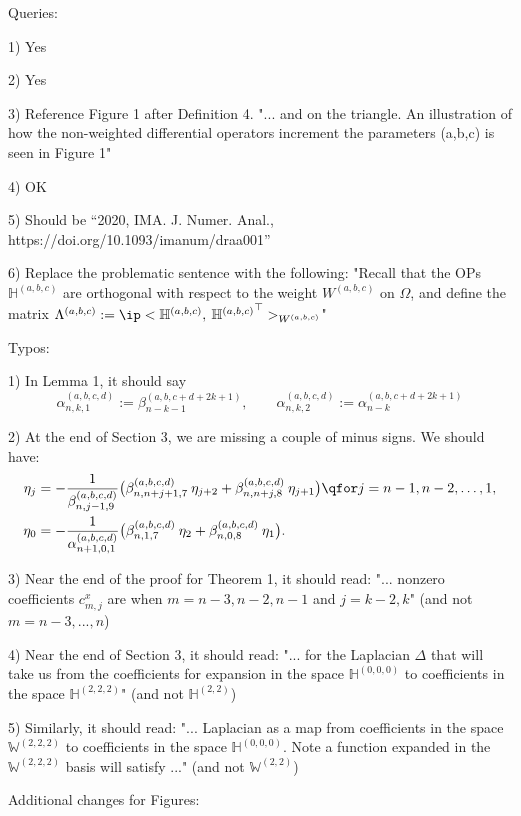 \documentclass[11pt, oneside]{article}   	%
\begin{document}
Queries:

1) Yes 

2) Yes

3) Reference Figure 1 after Definition 4.
	"... and on the triangle. An illustration of how the non-weighted differential operators increment the parameters (a,b,c) is seen in Figure 1"
	
4) OK

5) Should be ``2020, IMA. J. Numer. Anal., https://doi.org/10.1093/imanum/draa001''

6) Replace the problematic sentence with the following:
	"Recall that the OPs $\mathbb{H}^{(a,b,c)}$ are orthogonal with respect to the weight $W^{(a,b,c)}$ on $\Omega$, and define the matrix $\Lambda^{(a,b,c)} := \ip< \mathbb{H}^{(a,b,c)}, \: {\mathbb{H}^{(a,b,c)}}^\top >_{W^{(a,b,c)}}$"
	
	
Typos:

1) In Lemma 1, it should say 
$$
\alpha^{(a,b,c,d)}_{n,k,1} := \beta_{n-k-1}^{(a, b, c+d+2k+1)}, \qquad \alpha^{(a,b,c,d)}_{n,k,2} := \alpha_{n-k}^{(a, b, c+d+2k+1)}
$$

2) At the end of Section 3, we are missing a couple of minus signs. We should have:
\begin{align*}
	\eta_j &= - \frac{1}{\beta^{(a,b,c,d)}_{n,j-1,9}} \big( \beta^{(a,b,c,d)}_{n,n+j+1,7} \: \eta_{j+2} + \beta^{(a,b,c,d)}_{n,n+j,8} \: \eta_{j+1} \big) \qfor j = n-1,n-2,\dots,1, \\
	\eta_0 &= - \frac{1}{\alpha^{(a,b,c,d)}_{n+1,0,1}} \big( \beta^{(a,b,c,d)}_{n,1,7} \: \eta_{2} + \beta^{(a,b,c,d)}_{n,0,8} \: \eta_{1} \big).
\end{align*}

3) Near the end of the proof for Theorem 1, it should read:
	"... nonzero coefficients $c^x_{m,j}$ are when $m = n-3, n-2, n-1$ and $j = k-2, k$"
(and not $m = n-3,...,n$)

4) Near the end of Section 3, it should read:
	"... for the Laplacian $\Delta$ that will take us from the coefficients for expansion in the space $\mathbb{H}^{(0,0,0)}$ to coefficients in the space $\mathbb{H}^{(2,2,2)}$"
(and not $\mathbb{H}^{(2,2)}$)

5) Similarly, it should read:
	"... Laplacian as a map from coefficients in the space $\mathbb{W}^{(2,2,2)}$ to coefficients in the space $\mathbb{H}^{(0,0,0)}$. Note a function expanded in the $\mathbb{W}^{(2,2,2)}$ basis will satisfy ..."
(and not $\mathbb{W}^{(2,2)}$)


Additional changes for Figures:
\end{document}
